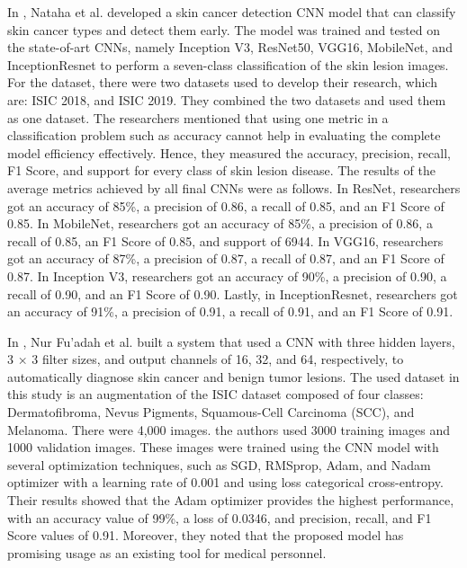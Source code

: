 \documentclass[12pt]{diazessay}
\begin{document}
    In \cite{Nahata2020-mb}, Nataha et al. developed a skin cancer detection CNN model that can classify skin cancer types and detect them early. The model was trained and tested on the state-of-art CNNs, namely Inception V3, ResNet50, VGG16, MobileNet, and InceptionResnet to perform a seven-class classification of the skin lesion images. For the dataset, there were two datasets used to develop their research, which are: ISIC 2018, and ISIC 2019. They combined the two datasets and used them as one dataset. The researchers mentioned that using one metric in a classification problem such as accuracy cannot help in evaluating the complete model efficiency effectively. Hence, they measured the accuracy, precision, recall, F1 Score, and support for every class of skin lesion disease. The results of the average metrics achieved by all final CNNs were as follows. In ResNet, researchers got an accuracy of 85\%, a precision of 0.86, a recall of 0.85, and an F1 Score of 0.85. In MobileNet, researchers got an accuracy of 85\%, a precision of 0.86, a recall of 0.85, an F1 Score of 0.85, and support of 6944. In VGG16, researchers got an accuracy of 87\%, a precision of 0.87, a recall of 0.87, and an F1 Score of 0.87. In Inception V3, researchers got an accuracy of 90\%, a precision of 0.90, a recall of 0.90, and an F1 Score of 0.90. Lastly, in InceptionResnet, researchers got an accuracy of 91\%, a precision of 0.91, a recall of 0.91, and an F1 Score of 0.91.
    
    In \cite{Fuadah2020-os}, Nur Fu'adah et al. built a system that used a CNN with three hidden layers, 3 × 3 filter sizes, and output channels of 16, 32, and 64, respectively, to automatically diagnose skin cancer and benign tumor lesions. The used dataset in this study is an augmentation of the ISIC dataset composed of four classes: Dermatofibroma, Nevus Pigments, Squamous-Cell Carcinoma (SCC), and Melanoma. There were 4,000 images. the authors used 3000 training images and 1000 validation images. These images were trained using the CNN model with several optimization techniques, such as SGD, RMSprop, Adam, and Nadam optimizer with a learning rate of 0.001 and using loss categorical cross-entropy.  Their results showed that the Adam optimizer provides the highest performance, with an accuracy value of 99\%, a loss of 0.0346, and precision, recall, and F1 Score values of 0.91. Moreover, they noted that the proposed model has promising usage as an existing tool for medical personnel.
    
\end{document}
